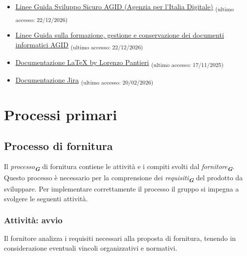 \documentclass[a4paper,12pt]{article}
\newcommand{\glossario}[1]{\textit{#1}\textsubscript{\textbf{\textit{\textcolor{lightblack}{G}}}}}
\newcommand{\ped}[1]{\textsubscript{#1}}
\begin{document}
\begin{itemize}
\begin{itemize}
              \item \href{https://www.math.unipd.it/~tullio/IS-1/2025/Dispense/T10.pdf}{\ul{https://www.math.unipd.it/~tullio/IS-1/2025/Dispense/T10.pdf}} \ped{(ultimo accesso: 17/02/2025)}
              \item \href{https://www.math.unipd.it/~tullio/IS-1/2025/Dispense/T11.pdf}{\ul{https://www.math.unipd.it/~tullio/IS-1/2025/Dispense/T11.pdf}} \ped{(ultimo accesso: 17/02/2025)}
          \end{itemize}
    \item \href{https://www.agid.gov.it/it/sicurezza/cert-pa/linee-guida-sviluppo-del-software-sicuro}{\ul{Linee Guida Sviluppo Sicuro AGID (Agenzia per l'Italia Digitale)}} \ped{(ultimo accesso: 22/12/2026)}
    \item  \href{https://www.agid.gov.it/it/linee-guida#index-3}{\ul{Linee Guida sulla formazione, gestione e conservazione dei documenti informatici AGID}} \ped{(ultimo accesso: 22/12/2026)}
    \item \href{https://www.lorenzopantieri.net/LaTeX_files/LaTeXpedia.pdf}{\ul{Documentazione \LaTeX{} by Lorenzo Pantieri}} \ped{(ultimo accesso: 17/11/2025)}
    \item \href{https://confluence.atlassian.com/jira}{\ul{Documentazione Jira}} \ped{(ultimo accesso: 20/02/2026)}
\end{itemize}

\section{Processi primari}

\subsection{Processo di fornitura}\label{processoDiFornitura}
Il \glossario{processo} di fornitura contiene le attività e i compiti svolti
dal \glossario{fornitore}. Questo processo è necessario per la comprensione dei
\glossario{requisiti} del prodotto da sviluppare. Per implementare
correttamente il processo il gruppo si impegna a svolgere le seguenti attività.

\subsubsection{Attività: avvio}
Il fornitore analizza i requisiti necessari alla proposta di fornitura, tenendo
in considerazione eventuali vincoli organizzativi e normativi.
\end{document}

